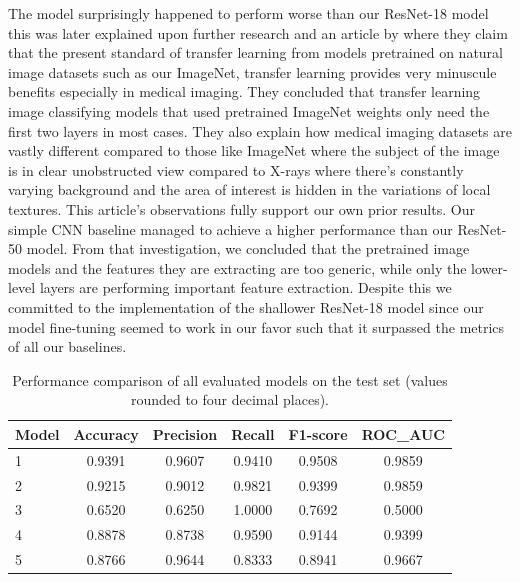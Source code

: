 \documentclass[11pt]{article}
\begin{document}
The model surprisingly happened to perform worse than our ResNet-18 model this was later explained upon further research and an article by \citep{Raghu2019} where they claim that the present standard of transfer learning from models pretrained on natural image datasets such as our ImageNet, transfer learning provides very minuscule benefits especially in medical imaging. They concluded that transfer learning image classifying models that used pretrained ImageNet weights only need the first two layers in most cases. They also explain how medical imaging datasets are vastly different compared to those like ImageNet where the subject of the image is in clear unobstructed view compared to X-rays where there’s constantly varying background and the area of interest is hidden in the variations of local textures. This article’s observations fully support our own prior results. Our simple CNN baseline managed to achieve a higher performance than our ResNet-50 model. From that investigation, we concluded that the pretrained image models and the features they are extracting are too generic, while only the lower-level layers are performing important feature extraction. Despite this we committed to the implementation of the shallower ResNet-18 model since our model fine-tuning seemed to work in our favor such that it surpassed the metrics of all our baselines. 

\begin{table}[h]
\centering
\scriptsize %
\begin{tabular}{lccccc}
\hline
\textbf{Model} & \textbf{Accuracy} & \textbf{Precision} & \textbf{Recall} & \textbf{F1-score} & \textbf{ROC\_AUC} \\
\hline
1          & 0.9391 & 0.9607 & 0.9410 & 0.9508 & 0.9859 \\
2 & 0.9215 & 0.9012 & 0.9821 & 0.9399 & 0.9859 \\
3                   & 0.6520 & 0.6250 & 1.0000 & 0.7692 & 0.5000 \\
4                        & 0.8878 & 0.8738 & 0.9590 & 0.9144 & 0.9399 \\
5                & 0.8766 & 0.9644 & 0.8333 & 0.8941 & 0.9667 \\
\hline
\end{tabular}
\caption{Performance comparison of all evaluated models on the test set (values rounded to four decimal places).}
\label{tab:model_performance}
\end{table}
\end{document}
